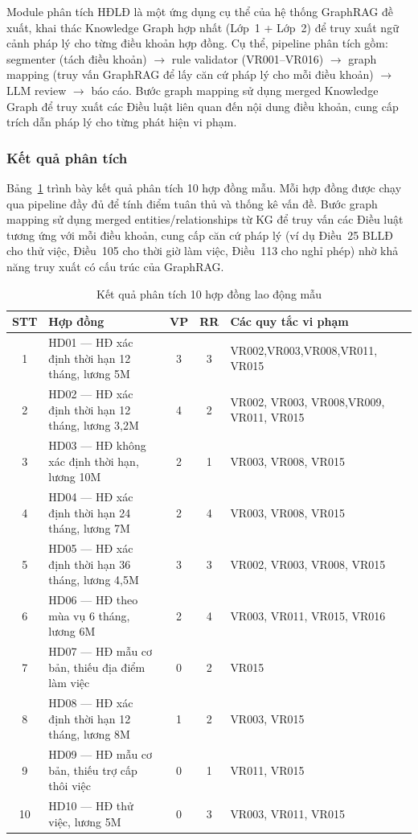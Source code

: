\documentclass[../DoAn.tex]{subfiles}
\begin{document}
Module phân tích HĐLĐ là một ứng dụng cụ thể của hệ thống GraphRAG đề xuất, khai thác Knowledge Graph hợp nhất (Lớp~1 + Lớp~2) để truy xuất ngữ cảnh pháp lý cho từng điều khoản hợp đồng. Cụ thể, pipeline phân tích gồm: segmenter (tách điều khoản) $\to$ rule validator (VR001--VR016) $\to$ graph mapping (truy vấn GraphRAG để lấy căn cứ pháp lý cho mỗi điều khoản) $\to$ LLM review $\to$ báo cáo. Bước graph mapping sử dụng merged Knowledge Graph để truy xuất các Điều luật liên quan đến nội dung điều khoản, cung cấp trích dẫn pháp lý cho từng phát hiện vi phạm.

\subsubsection*{Kết quả phân tích}

Bảng~\ref{table:contract_e2e} trình bày kết quả phân tích 10 hợp đồng mẫu. Mỗi hợp đồng được chạy qua pipeline đầy đủ để tính điểm tuân thủ và thống kê vấn đề. Bước graph mapping sử dụng merged entities/relationships từ KG để truy vấn các Điều luật tương ứng với mỗi điều khoản, cung cấp căn cứ pháp lý (ví dụ Điều~25 BLLĐ cho thử việc, Điều~105 cho thời giờ làm việc, Điều~113 cho nghỉ phép) nhờ khả năng truy xuất có cấu trúc của GraphRAG.


\begin{table}[H]
\centering
\caption{Kết quả phân tích 10 hợp đồng lao động mẫu}
\label{table:contract_e2e}
\small
\begin{tabularx}{\textwidth}{|c|X|c|c|X|}
\hline
\textbf{STT} & \textbf{Hợp đồng} & \textbf{VP} & \textbf{RR} & \textbf{Các quy tắc vi phạm} \\
\hline
1  & HD01 --- HĐ xác định thời hạn 12 tháng, lương 5M & 3 & 3 & VR002,VR003,VR008,VR011, VR015 \\
2  & HD02 --- HĐ xác định thời hạn 12 tháng, lương 3,2M & 4 & 2 & VR002, VR003, VR008,VR009, VR011, VR015 \\
3  & HD03 --- HĐ không xác định thời hạn, lương 10M & 2 & 1 & VR003, VR008, VR015 \\
4  & HD04 --- HĐ xác định thời hạn 24 tháng, lương 7M & 2 & 4 & VR003, VR008, VR015 \\
5  & HD05 --- HĐ xác định thời hạn 36 tháng, lương 4,5M & 3 & 3 & VR002, VR003, VR008, VR015 \\
6  & HD06 --- HĐ theo mùa vụ 6 tháng, lương 6M & 2 & 4 & VR003, VR011, VR015, VR016 \\
7  & HD07 --- HĐ mẫu cơ bản, thiếu địa điểm làm việc & 0 & 2 & VR015 \\
8  & HD08 --- HĐ xác định thời hạn 12 tháng, lương 8M & 1 & 2 & VR003, VR015 \\
9  & HD09 --- HĐ mẫu cơ bản, thiếu trợ cấp thôi việc & 0 & 1 & VR011, VR015 \\
10 & HD10 --- HĐ thử việc, lương 5M & 0 & 3 & VR003, VR011, VR015 \\
\hline
\end{tabularx}
\end{table}
\end{document}
